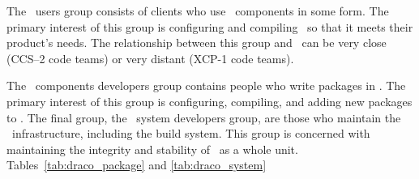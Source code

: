 The \draco\ users group consists of clients who use \draco\ components
in some form.  The primary interest of this group is configuring  and
compiling  \draco\ so that it meets their product's needs.  The
relationship between this group and \draco\ can be very close (CCS--2
code teams) or very distant (XCP-1 code teams).

The \draco\ components developers group contains people who write
packages in \draco.  The primary interest of this group is
configuring, compiling, and adding new packages to \draco.  The final
group, the \draco\ system developers group, are those who maintain the
\draco\ infrastructure, including the build system.  This group is
concerned with maintaining the integrity and stability of \draco\ as a
whole unit. Tables~\ref{tab:draco_package} and \ref{tab:draco_system}
